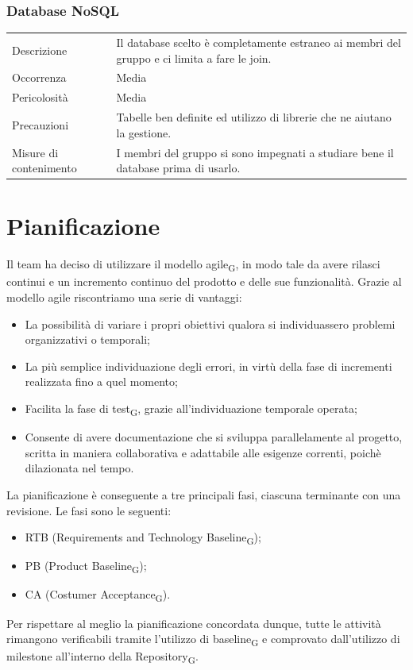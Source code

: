 \documentclass{article}
\begin{document}
\subsubsection{Database NoSQL}
\begin{center}
\begin{tabular}{P{10em} P{20em}} 
     Descrizione & Il database scelto è completamente estraneo ai membri del gruppo e ci limita a fare le join. \\ 
    Occorrenza & Media\\
    Pericolosità & Media \\
    Precauzioni & Tabelle ben definite ed utilizzo di librerie che ne aiutano la gestione.\\
    Misure di contenimento & I membri del gruppo si sono impegnati a studiare bene il database prima di usarlo. \\
\end{tabular}
\label{tab:esptec}
\end{center}

\section{Pianificazione}
Il team ha deciso di utilizzare il modello agile\textsubscript{G}, in modo tale da avere rilasci continui e un incremento continuo del prodotto e delle sue funzionalità. Grazie al modello agile riscontriamo una serie di vantaggi:
\begin{itemize}
    \item La possibilità di variare i propri obiettivi qualora si individuassero problemi organizzativi o temporali;
    \item La più semplice individuazione degli errori, in virtù della fase di incrementi realizzata fino a quel momento;
    \item Facilita la fase di test\textsubscript{G}, grazie all’individuazione temporale operata;
    \item Consente di avere documentazione che si sviluppa parallelamente al progetto, scritta in maniera collaborativa e adattabile alle esigenze correnti, poichè dilazionata nel tempo.
\end{itemize}

La pianificazione è conseguente a tre principali fasi, ciascuna terminante con una revisione. Le fasi sono le seguenti:
\begin{itemize}
    \item RTB (Requirements and Technology Baseline\textsubscript{G});
    \item PB (Product Baseline\textsubscript{G});
    \item CA (Costumer Acceptance\textsubscript{G}).
\end{itemize}
Per rispettare al meglio la pianificazione concordata dunque, tutte le  attività rimangono verificabili tramite l’utilizzo di baseline\textsubscript{G} e comprovato dall’utilizzo di milestone all'interno della Repository\textsubscript{G}.
\end{document}
